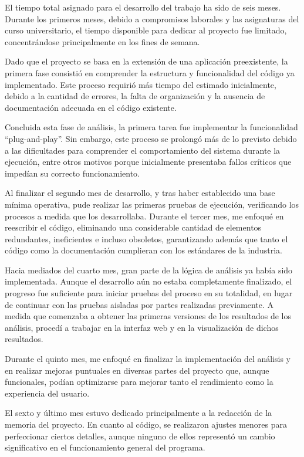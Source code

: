 \documentclass[a4paper, 12pt]{book}
\begin{document}
El tiempo total asignado para el desarrollo del trabajo ha sido de seis meses. Durante los primeros meses, debido a compromisos laborales y las asignaturas del curso universitario, el tiempo disponible para dedicar al proyecto fue limitado, concentrándose principalmente en los fines de semana.

Dado que el proyecto se basa en la extensión de una aplicación preexistente, la primera fase consistió en comprender la estructura y funcionalidad del código ya implementado. Este proceso requirió más tiempo del estimado inicialmente, debido a la cantidad de errores, la falta de organización y la ausencia de documentación adecuada en el código existente.

Concluida esta fase de análisis, la primera tarea fue implementar la funcionalidad ``plug-and-play''. Sin embargo, este proceso se prolongó más de lo previsto debido a las dificultades para comprender el comportamiento del sistema durante la ejecución, entre otros motivos porque inicialmente presentaba fallos críticos que impedían su correcto funcionamiento.

Al finalizar el segundo mes de desarrollo, y tras haber establecido una base mínima operativa, pude realizar las primeras pruebas de ejecución, verificando los procesos a medida que los desarrollaba. Durante el tercer mes, me enfoqué en reescribir el código, eliminando una considerable cantidad de elementos redundantes, ineficientes e incluso obsoletos, garantizando además que tanto el código como la documentación cumplieran con los estándares de la industria.

Hacia mediados del cuarto mes, gran parte de la lógica de análisis ya había sido implementada. Aunque el desarrollo aún no estaba completamente finalizado, el progreso fue suficiente para iniciar pruebas del proceso en su totalidad, en lugar de continuar con las pruebas aisladas por partes realizadas previamente. A medida que comenzaba a obtener las primeras versiones de los resultados de los análisis, procedí a trabajar en la interfaz web y en la visualización de dichos resultados.

Durante el quinto mes, me enfoqué en finalizar la implementación del análisis y en realizar mejoras puntuales en diversas partes del proyecto que, aunque funcionales, podían optimizarse para mejorar tanto el rendimiento como la experiencia del usuario.

El sexto y último mes estuvo dedicado principalmente a la redacción de la memoria del proyecto. En cuanto al código, se realizaron ajustes menores para perfeccionar ciertos detalles, aunque ninguno de ellos representó un cambio significativo en el funcionamiento general del programa.
\end{document}

